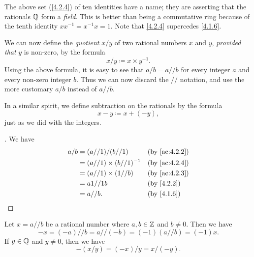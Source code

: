 \begin{rmk}\label{4.2.5}
  The above set (\cref{4.2.4}) of ten identities have a name;
  they are asserting that the rationals \(\mathbb{Q}\) form a \emph{field}.
  This is better than being a commutative ring because of the tenth identity \(xx^{-1} = x^{-1}x = 1\).
  Note that \cref{4.2.4} supercedes \cref{4.1.6}.
\end{rmk}

\begin{ac}\label{ac:4.2.4}
  We can now define the \emph{quotient} \(x / y\) of two rational numbers \(x\) and \(y\), \emph{provided that} \(y\) is non-zero, by the formula
  \[
    x / y \coloneqq x \times y^{-1}.
  \]
  Using the above formula, it is easy to see that \(a / b = a // b\) for every integer \(a\) and every non-zero integer \(b\).
  Thus we can now discard the \(//\) notation, and use the more customary \(a / b\) instead of \(a // b\).

  In a similar spirit, we define subtraction on the rationals by the formula
  \[
    x - y \coloneqq x + (-y),
  \]
  just as we did with the integers.
\end{ac}

\begin{proof}[]
  We have
  \begin{align*}
    a / b & = (a // 1) / (b // 1)           &  & \by{ac:4.2.2} \\
          & = (a // 1) \times (b // 1)^{-1} &  & \by{ac:4.2.4} \\
          & = (a // 1) \times (1 // b)      &  & \by{ac:4.2.3} \\
          & = a1 // 1b                      &  & \by{4.2.2}    \\
          & = a // b.                       &  & \by{4.1.6}
  \end{align*}
\end{proof}

\begin{ac}\label{ac:4.2.5}
  Let \(x = a // b\) be a rational number where \(a, b \in \mathbb{Z}\) and \(b \neq 0\).
  Then we have
  \[
    -x = (-a) // b = a // (-b) = (-1) (a // b) = (-1) x.
  \]
  If \(y \in \mathbb{Q}\) and \(y \neq 0\), then we have
  \[
    -(x / y) = (-x) / y = x / (-y).
  \]
\end{ac}

